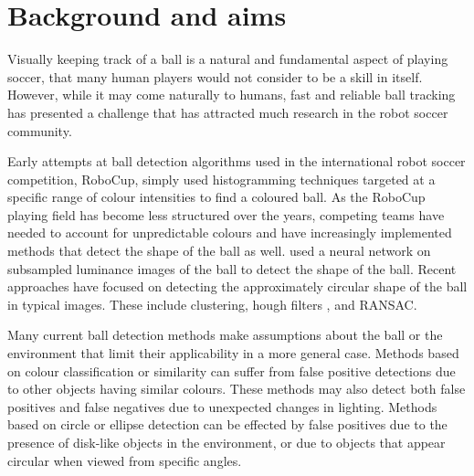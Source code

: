 \documentclass[11pt]{scrartcl}
\begin{document}
	\section{Background and aims} {

  		Visually keeping track of a ball is a natural and fundamental aspect of playing 
  		soccer, that many human players would not consider to be a skill in itself. 
  		However, while it may come naturally to humans, fast and reliable ball
        tracking has presented a challenge that has attracted much research in
        the robot soccer community.
        


        Early attempts at ball detection algorithms used in the international robot soccer competition,
        RoboCup, simply used histogramming techniques targeted at a specific range of colour intensities to find a coloured ball. As the RoboCup playing field has become less structured over the years, competing teams have needed to account for unpredictable colours and have increasingly implemented methods that detect the shape of the ball as well.
        \citet{schulz2007ball} used a neural network on
        subsampled luminance images of the ball to detect the shape of the 
        ball. Recent approaches have focused on detecting the approximately
        circular shape of the ball in typical images. These include
        clustering, hough filters \citet{li2013survey}, and RANSAC.


        Many current ball detection methods make assumptions about the ball or
        the environment that limit their applicability in a more general case. Methods
        based on colour classification or similarity can suffer from false
        positive detections due to other objects having similar colours. These methods may 
        also detect both false positives and false negatives due to unexpected changes
        in lighting. Methods based on circle or ellipse detection can be effected by
        false positives due to the presence of disk-like objects in the
        environment, or due to objects that appear circular when viewed from
        specific angles.

}
\end{document}
